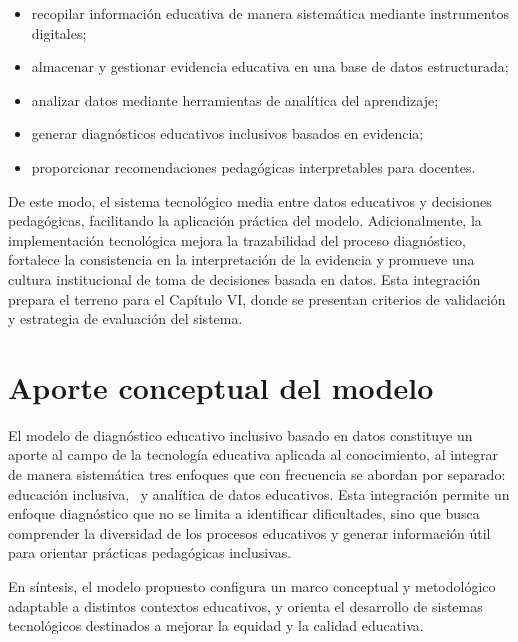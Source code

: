 \begin{refsection}
\begin{itemize}
\item recopilar información educativa de manera sistemática mediante instrumentos digitales;
\item almacenar y gestionar evidencia educativa en una base de datos estructurada;
\item analizar datos mediante herramientas de analítica del aprendizaje;
\item generar diagnósticos educativos inclusivos basados en evidencia;
\item proporcionar recomendaciones pedagógicas interpretables para docentes.
\end{itemize}

De este modo, el sistema tecnológico media entre datos educativos y decisiones pedagógicas, facilitando la aplicación práctica del modelo. Adicionalmente, la implementación tecnológica mejora la trazabilidad del proceso diagnóstico, fortalece la consistencia en la interpretación de la evidencia y promueve una cultura institucional de toma de decisiones basada en datos. Esta integración prepara el terreno para el Capítulo VI, donde se presentan criterios de validación y estrategia de evaluación del sistema.

\section{Aporte conceptual del modelo}

El modelo de diagnóstico educativo inclusivo basado en datos constituye un aporte al campo de la tecnología educativa aplicada al conocimiento, al integrar de manera sistemática tres enfoques que con frecuencia se abordan por separado: educación inclusiva, \DUA\ y analítica de datos educativos. Esta integración permite un enfoque diagnóstico que no se limita a identificar dificultades, sino que busca comprender la diversidad de los procesos educativos y generar información útil para orientar prácticas pedagógicas inclusivas.

En síntesis, el modelo propuesto configura un marco conceptual y metodológico adaptable a distintos contextos educativos, y orienta el desarrollo de sistemas tecnológicos destinados a mejorar la equidad y la calidad educativa.

\printbibliography[heading=subbibliography,title={Referencias (Capítulo V)}]
\end{refsection}